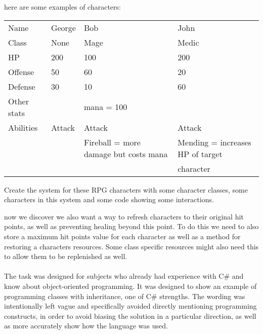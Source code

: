 here are some examples of characters:
\begin{table}[h]
\centering
\label{my-label}
\begin{tabular}{llll}
Name        & George & Bob                                   & John                                      \\
Class       & None   & Mage                                  & Medic                                     \\
HP          & 200    & 100                                   & 200                                       \\
Offense     & 50     & 60                                    & 20                                        \\
Defense     & 30     & 10                                    & 60                                        \\
Other stats &        & mana = 100                            &                                           \\
Abilities   & Attack & Attack                                & Attack                                    \\
            &        & Fireball = more damage but costs mana & Mending = increases HP of target          \\
            &        &                                       & character
\end{tabular}
\end{table}

Create the system for these RPG characters with some character classes, some characters in this system and some code showing some interactions.

now we discover we also want a way to refresh characters to their original hit points, as well as preventing healing beyond this point.
To do this we need to also store a maximum hit points value for each character as well as a method for restoring a characters resources.
Some class specific resources might also need this to allow them to be replenished as well.
\\\\
The task was designed for subjects who already had experience with C\# and know about object-oriented programming.
It was designed to show an example of programming classes with inheritance, one of C\# strengths.
The wording was intentionally left vague and specifically avoided directly mentioning programming constructs, in order to avoid biasing the solution in a particular direction, as well as more accurately show how the language was used.

